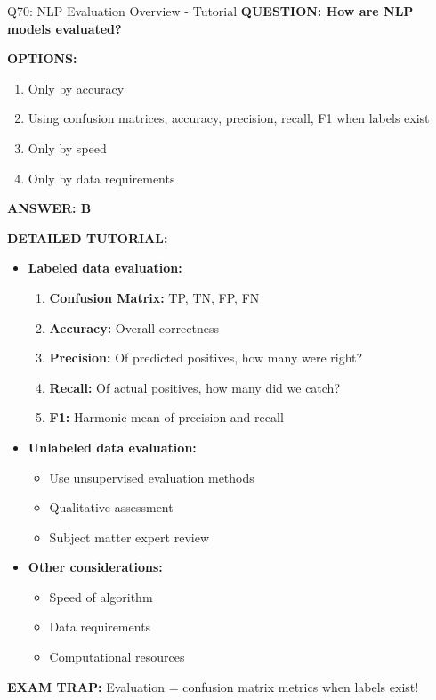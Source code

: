 \documentclass[8pt]{beamer}
\begin{document}
	\begin{frame}{Q70: NLP Evaluation Overview - Tutorial}
		\fontsize{6.5}{7.5}\selectfont
		\textbf{QUESTION: How are NLP models evaluated?}
		
		\vspace{0.1cm}
		\textbf{OPTIONS:}
		\begin{enumerate}
			\item Only by accuracy
			\item Using confusion matrices, accuracy, precision, recall, F1 when labels exist
			\item Only by speed
			\item Only by data requirements
		\end{enumerate}
		
		\vspace{0.1cm}
		\textcolor{myblue}{\textbf{ANSWER: B}}
		
		\vspace{0.1cm}
		\textbf{DETAILED TUTORIAL:}
		\begin{itemize}
			\item \textbf{Labeled data evaluation:}
			\begin{enumerate}
				\item \textbf{Confusion Matrix:} TP, TN, FP, FN
				\item \textbf{Accuracy:} Overall correctness
				\item \textbf{Precision:} Of predicted positives, how many were right?
				\item \textbf{Recall:} Of actual positives, how many did we catch?
				\item \textbf{F1:} Harmonic mean of precision and recall
			\end{enumerate}
			\item \textbf{Unlabeled data evaluation:}
			\begin{itemize}
				\item Use unsupervised evaluation methods
				\item Qualitative assessment
				\item Subject matter expert review
			\end{itemize}
			\item \textbf{Other considerations:}
			\begin{itemize}
				\item Speed of algorithm
				\item Data requirements
				\item Computational resources
			\end{itemize}
		\end{itemize}
		
		\textcolor{myred}{\textbf{EXAM TRAP:}} Evaluation = \textcolor{myblue}{confusion matrix metrics} when labels exist!
	\end{frame}
	
\end{document}

